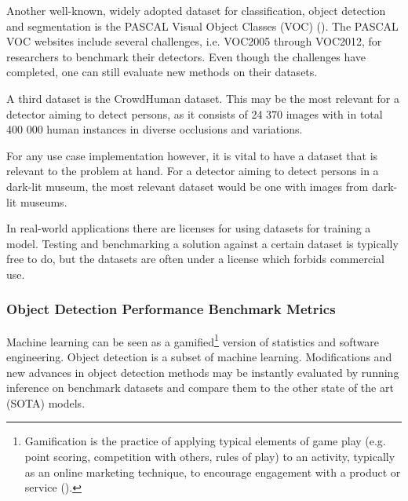 Another well-known, widely adopted dataset for classification, object detection and segmentation is the PASCAL Visual Object Classes (VOC) (\cite{ev2010pascaldataset}). The PASCAL VOC websites include several challenges, i.e. VOC2005 through VOC2012, for researchers to benchmark their detectors. Even though the challenges have completed, one can still evaluate new methods on their datasets.

A third dataset is the CrowdHuman dataset. This may be the most relevant for a detector aiming to detect persons, as it consists of 24 370 images with in total 400 000 human instances in diverse occlusions and variations.

For any use case implementation however, it is vital to have a dataset that is relevant to the problem at hand. For a detector aiming to detect persons in a dark-lit museum, the most relevant dataset would be one with images from dark-lit museums.

In real-world applications there are licenses for using datasets for training a model. Testing and benchmarking a solution against a certain dataset is typically free to do, but the datasets are often under a license which forbids commercial use.

\subsubsection{Object Detection Performance Benchmark Metrics}
\label{sec:accuracy_of_model_inferences}
Machine learning can be seen as a gamified\footnote{Gamification is the practice of applying typical elements of game play (e.g. point scoring, competition with others, rules of play) to an activity, typically as an online marketing technique, to encourage engagement with a product or service (\cite{ox2023gamification}).} version of statistics and software engineering. Object detection is a subset of machine learning. Modifications and new advances in object detection methods may be instantly evaluated by running inference on benchmark datasets and compare them to the other state of the art (SOTA) models.


